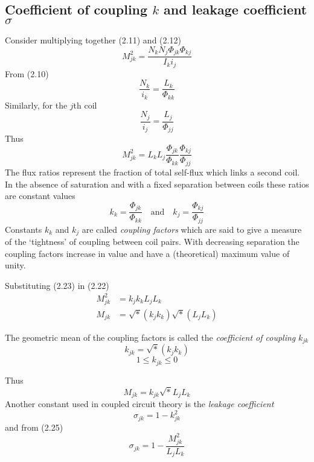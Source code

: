 \documentclass[a4paper,numbers=noenddot,12pt]{scrbook}
\begin{document}
\subsection{Coefficient of coupling $k$ and leakage coefficient $\sigma$} Consider multiplying together (2.11) and (2.12)
\begin{equation*}
    M_{jk}^2 = \dfrac{N_k N_j \Phi_{jk} \Phi_{kj}}{I_k i_j}
\end{equation*}
From (2.10)
\begin{equation*}
    \dfrac{N_k}{i_k} = \dfrac{L_k}{\Phi_{kk}}
\end{equation*}
Similarly, for the $j$th coil
\begin{equation*}
    \dfrac{N_j}{i_j} = \dfrac{L_j}{\Phi_{jj}}
\end{equation*}
Thus
\begin{equation}
    M_{jk}^2 = L_k L_j \dfrac{\Phi_{jk}}{\Phi_{kk}} \dfrac{\Phi_{kj}}{\Phi_{jj}}
    \label{eq:Eq2.22}
\end{equation}
The flux ratios represent the fraction of total self-flux which links a second coil. In the absence of saturation and with a fixed separation between coils these ratios are constant values
\begin{equation}
    k_k = \dfrac{\Phi_{jk}}{\Phi_{kk}} \quad \text{and} \quad k_j = \dfrac{\Phi_{kj}}{\Phi_{jj}}
    \label{eq:Eq2.23}
\end{equation}
Constants $k_k$ and $k_j$ are called \textit{coupling factors} which are said to give a measure of the `tightness' of coupling between coil pairs. With decreasing separation the coupling factors increase in value and have a (theoretical) maximum value of unity.

Substituting (2.23) in (2.22)
\begin{align*}
    M_{jk}^2 & = k_j k_k L_j L_k \\
    M_{jk} & = \sqrt*(k_j k_k) \sqrt*(L_j L_k)
\end{align*}

The geometric mean of the coupling factors is called the \textit{coefficient of coupling} $k_{jk}$
\begin{equation}
    k_{jk} = \sqrt*(k_j k_k)
    \label{eq:Eq2.24}
\end{equation}
\begin{equation*}
    1 \leq k_{jk} \leq 0
\end{equation*}

Thus
\begin{equation}
    M_{jk} = k_{jk} \sqrt* L_j L_k
    \label{eq:Eq2.25}
\end{equation}
Another constant used in coupled circuit theory is the \textit{leakage coefficient}
\begin{equation}
    \sigma_{jk} = 1 - k_{jk}^2
    \label{eq:Eq2.26}
\end{equation}
and from (2.25)
\begin{equation}
    \sigma_{jk} = 1 - \dfrac{M_{jk}^2}{L_j L_k}
    \label{eq:Eq2.27}
\end{equation}
\end{document}
